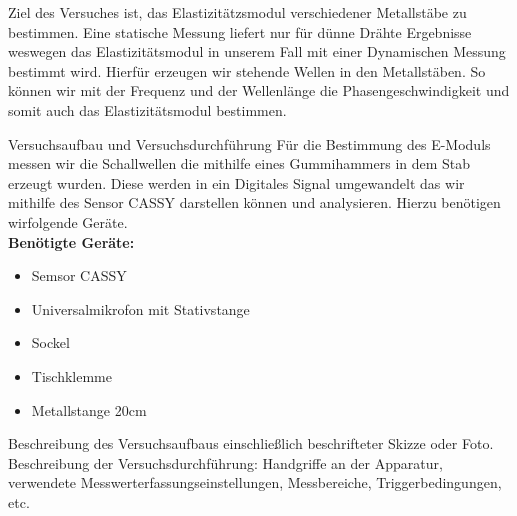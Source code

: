 \documentclass[twoside]{protokoll}
\begin{document}
 
\begin{versuchsziele}
Ziel des Versuches ist, das Elastizitätzsmodul verschiedener Metallstäbe zu bestimmen.
Eine statische Messung liefert nur für dünne Drähte Ergebnisse weswegen das Elastizitätsmodul in unserem Fall mit einer Dynamischen Messung bestimmt wird. Hierfür erzeugen wir stehende Wellen in den Metallstäben. So können wir mit der Frequenz und der Wellenlänge die Phasengeschwindigkeit und somit auch das Elastizitätsmodul bestimmen. 
\end{versuchsziele}

\begin{aufgabe}{Versuchsaufbau und Versuchsdurchführung}
  Für die Bestimmung des E-Moduls messen wir die Schallwellen die mithilfe eines Gummihammers in dem Stab erzeugt wurden. Diese werden in ein Digitales Signal umgewandelt das wir mithilfe des Sensor CASSY darstellen können und analysieren. Hierzu benötigen wirfolgende Geräte.\\

\textbf{Benötigte Geräte:}
\begin{itemize}
\item Semsor CASSY
\item Universalmikrofon mit Stativstange
\item Sockel
\item Tischklemme
\item Metallstange 20cm

\end{itemize}
  
  
  
  Beschreibung des Versuchsaufbaus einschließlich beschrifteter Skizze
  oder Foto. Beschreibung der Versuchsdurchführung: Handgriffe an der
  Apparatur, verwendete Messwerterfassungseinstellungen, Messbereiche,
  Triggerbedingungen, etc.
\end{aufgabe}

%
%
%
%
%
\end{document}
